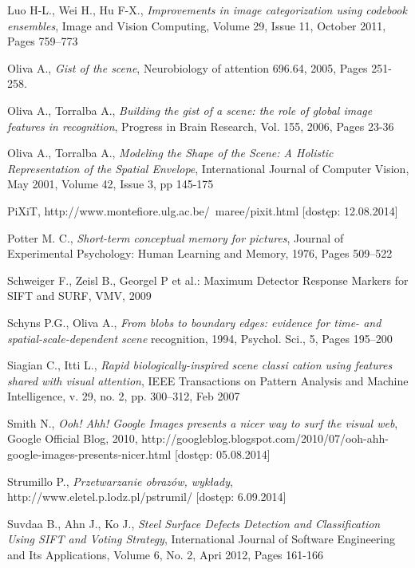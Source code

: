 \begin{thebibliography}{100}
 Luo H-L., Wei H., Hu F-X., \emph{Improvements in image categorization using codebook ensembles}, Image and Vision Computing, Volume 29, Issue 11, October 2011, Pages 759–773

 Oliva A., \emph{Gist of the scene}, Neurobiology of attention 696.64, 2005, Pages 251-258.

 Oliva A., Torralba A., \emph{Building the gist of a scene: the role of global image features in recognition}, Progress in Brain Research, Vol. 155, 2006, Pages 23-36

 Oliva A., Torralba A., \emph{Modeling the Shape of the Scene: A Holistic Representation of the Spatial Envelope}, International Journal of Computer Vision, May 2001, Volume 42, Issue 3, pp 145-175

 PiXiT, http://www.montefiore.ulg.ac.be/~maree/pixit.html [dostęp: 12.08.2014]

 Potter M. C., \emph{Short-term conceptual memory for pictures}, Journal of Experimental Psychology: Human Learning and Memory, 1976, Pages 509–522

 Schweiger F., Zeisl B., Georgel P et al.: Maximum Detector Response Markers for SIFT and SURF, VMV, 
2009

 Schyns P.G., Oliva A., \emph{From blobs to boundary edges: evidence for time- and spatial-scale-dependent scene} recognition, 1994, Psychol. Sci., 5, Pages 195–200

 Siagian C., Itti L., \emph{Rapid biologically-inspired scene classi cation using features shared with visual attention}, IEEE Transactions on Pattern Analysis and Machine Intelligence, v. 29, no. 2, pp. 300–312, Feb 2007

 Smith N., \emph{Ooh! Ahh! Google Images presents a nicer way to surf the visual web}, Google Official Blog, 2010, http://googleblog.blogspot.com/2010/07/ooh-ahh-google-images-presents-nicer.html [dostęp: 05.08.2014]

 Strumillo P., \emph{Przetwarzanie obrazów, wykłady}, http://www.eletel.p.lodz.pl/pstrumil/ [dostęp: 6.09.2014]

 Suvdaa B., Ahn J., Ko J., \emph{Steel Surface Defects Detection and Classification Using SIFT and Voting Strategy}, International Journal of Software Engineering and Its Applications, Volume 6, No. 2, Apri 2012, Pages 161-166


\end{thebibliography}
